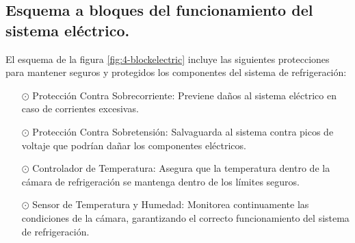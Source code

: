 \subsection{Esquema a bloques del funcionamiento del sistema eléctrico.}

El esquema de la figura \ref{fig:4-blockelectric} incluye las siguientes protecciones para mantener seguros y protegidos los componentes del sistema de refrigeración:
\begin{itemize}


	\item[$\odot$] Protección Contra Sobrecorriente: Previene daños al sistema eléctrico en caso de corrientes excesivas.

\item[$\odot$] Protección Contra Sobretensión: Salvaguarda al sistema contra picos de voltaje que podrían dañar los componentes eléctricos.

\item[$\odot$] Controlador de Temperatura: Asegura que la temperatura dentro de la cámara de refrigeración se mantenga dentro de los límites seguros.

\item[$\odot$] Sensor de Temperatura y Humedad: Monitorea continuamente las condiciones de la cámara, garantizando el correcto funcionamiento del sistema de refrigeración.

\end{itemize}
